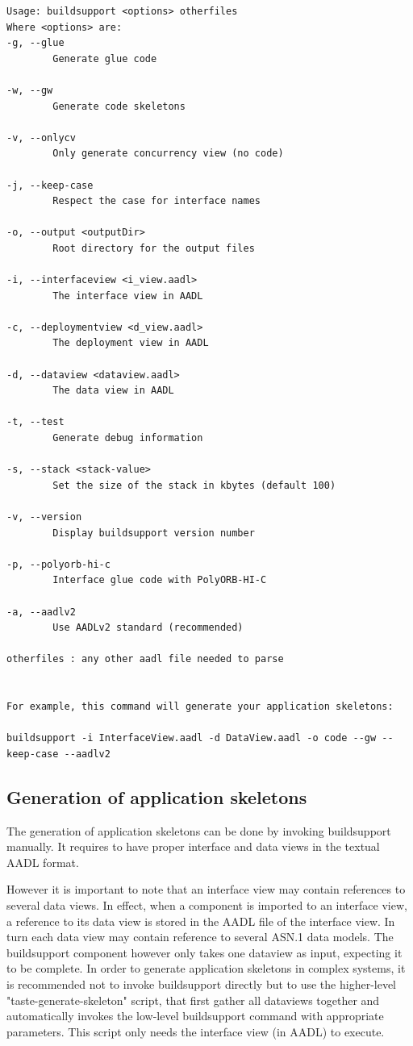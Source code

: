 \documentclass[11pt]{book}
\begin{document}
\begin{lstlisting}
Usage: buildsupport <options> otherfiles
Where <options> are:
-g, --glue
        Generate glue code

-w, --gw
        Generate code skeletons

-v, --onlycv
        Only generate concurrency view (no code)

-j, --keep-case
        Respect the case for interface names

-o, --output <outputDir>
        Root directory for the output files

-i, --interfaceview <i_view.aadl>
        The interface view in AADL

-c, --deploymentview <d_view.aadl>
        The deployment view in AADL

-d, --dataview <dataview.aadl>
        The data view in AADL

-t, --test
        Generate debug information

-s, --stack <stack-value>
        Set the size of the stack in kbytes (default 100)

-v, --version
        Display buildsupport version number

-p, --polyorb-hi-c
        Interface glue code with PolyORB-HI-C

-a, --aadlv2
        Use AADLv2 standard (recommended)

otherfiles : any other aadl file needed to parse


For example, this command will generate your application skeletons:

buildsupport -i InterfaceView.aadl -d DataView.aadl -o code --gw --keep-case --aadlv2
\end{lstlisting}

\subsection{Generation of application skeletons}
The generation of application skeletons can be done by invoking buildsupport manually. It requires to have proper interface and data views in the textual AADL format. 

However it is important to note that an interface view may contain references to several data views. In effect, when a component is imported to an interface view, a reference to its data view is stored in the AADL file of the interface view. In turn each data view may contain reference to several ASN.1 data models. The buildsupport component however only takes one dataview as input, expecting it to be complete. In order to generate application skeletons in complex systems, it is recommended not to invoke buildsupport directly but to use the higher-level "taste-generate-skeleton" script, that first gather all dataviews together and automatically invokes the low-level buildsupport command with appropriate parameters. This script only needs the interface view (in AADL) to execute.
\end{document}
